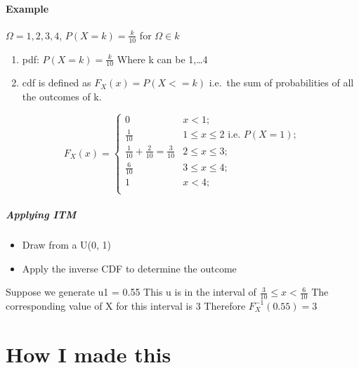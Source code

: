 \documentclass[
  letterpaper,
  DIV=11,
  numbers=noendperiod]{scrreprt}
\let\oldparagraph\paragraph
\renewcommand{\paragraph}[1]{\oldparagraph{#1}\mbox{}}
\providecommand{\tightlist}{%
  \setlength{\itemsep}{0pt}\setlength{\parskip}{0pt}}\usepackage{longtable,booktabs,array}
\begin{document}
\subsubsection{Example}\label{example}

\(\Omega = {1, 2, 3, 4}\), \(P(X = k) = \frac{k}{10}\) for
\(\Omega \in k\)

\begin{enumerate}
\def\labelenumi{\arabic{enumi}.}
\item
  pdf: \(P(X = k) = \frac{k}{10}\) Where k can be 1,\ldots4
\item
  cdf is defined as \(F_X(x) = P(X <= k)\) i.e.~the sum of probabilities
  of all the outcomes of k.
\end{enumerate}

\[
F_X(x) =
\begin{cases} 
0                                         &  x < 1; \\
\frac{1}{10}                              & 1 \leq x \leq{2} 
                                                \text{ i.e.  }P(X=1); \\
\frac{1}{10}+\frac{2}{10} = \frac{3}{10}  & 2 \leq x \leq{3}; \\
\frac{6}{10}                              & 3 \leq x \leq{4}; \\
1                                         &  x <4; \\
\end{cases}
\]

\paragraph{Applying ITM}\label{applying-itm}

\begin{itemize}
\tightlist
\item
  Draw from a U(0, 1)\\
\item
  Apply the inverse CDF to determine the outcome
\end{itemize}

Suppose we generate u1 = 0.55 This u is in the interval of
\(\frac{3}{10}\leq x < \frac{6}{10}\) The corresponding value of X for
this interval is 3 Therefore \(F_X^{-1}(0.55) =3\)

\cleardoublepage
{}
{}
\appendix

\chapter{How I made this}\label{how-i-made-this}
\end{document}
